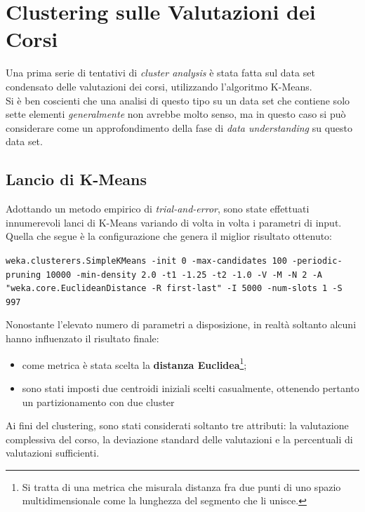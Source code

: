 \section{Clustering sulle Valutazioni dei Corsi}

    Una prima serie di tentativi di \textit{cluster analysis} è stata fatta sul data set condensato delle valutazioni dei corsi, utilizzando l'algoritmo K-Means. \\

    Si è ben coscienti che una analisi di questo tipo su un data set che contiene solo sette elementi \textit{generalmente} non avrebbe molto senso, ma in questo caso si può considerare come un approfondimento della fase di \textit{data understanding} su questo data set.

    \subsection{Lancio di K-Means}

        Adottando un metodo empirico di \textit{trial-and-error}, sono state effettuati innumerevoli lanci di K-Means variando di volta in volta i parametri di input. \\

        Quella che segue è la configurazione che genera il miglior risultato ottenuto:

        \begin{center}
            \texttt{weka.clusterers.SimpleKMeans -init 0 -max-candidates 100 -periodic-pruning 10000 -min-density 2.0 -t1 -1.25 -t2 -1.0 -V -M -N 2 -A "weka.core.EuclideanDistance -R first-last" -I 5000 -num-slots 1 -S 997}
        \end{center}

        Nonostante l'elevato numero di parametri a disposizione, in realtà soltanto alcuni hanno influenzato il risultato finale:

        \begin{itemize}
            \item come metrica è stata scelta la \textbf{distanza Euclidea}\footnote{Si tratta di una metrica che misurala distanza fra due punti di uno spazio multidimensionale come la lunghezza del segmento che li unisce.};
            \item sono stati imposti due centroidi iniziali scelti casualmente, ottenendo pertanto un partizionamento con due cluster
        \end{itemize}

        Ai fini del clustering, sono stati considerati soltanto tre attributi: la valutazione complessiva del corso, la deviazione standard delle valutazioni e la percentuali di valutazioni sufficienti.

